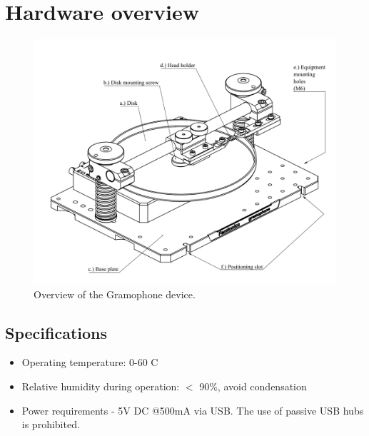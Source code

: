 \documentclass[11pt,a4paper]{article}
\begin{document}
\section{Hardware overview}
\begin{figure}[h] %
\centering
\includegraphics[clip, trim=1cm 0cm 0cm 1cm, width=1.00\textwidth]{labels_overview.PDF}
\caption{Overview of the Gramophone device.}
\label{fig:gram_overview}
\end{figure}


\subsection{Specifications}
\begin{itemize}
\item Operating temperature: 0-60 \degree C
\item Relative humidity during operation:  $<$ 90\%, avoid condensation 
\item Power requirements - 5V DC @500mA via USB. The use of passive USB hubs is prohibited.
\end{itemize}
\end{document}
